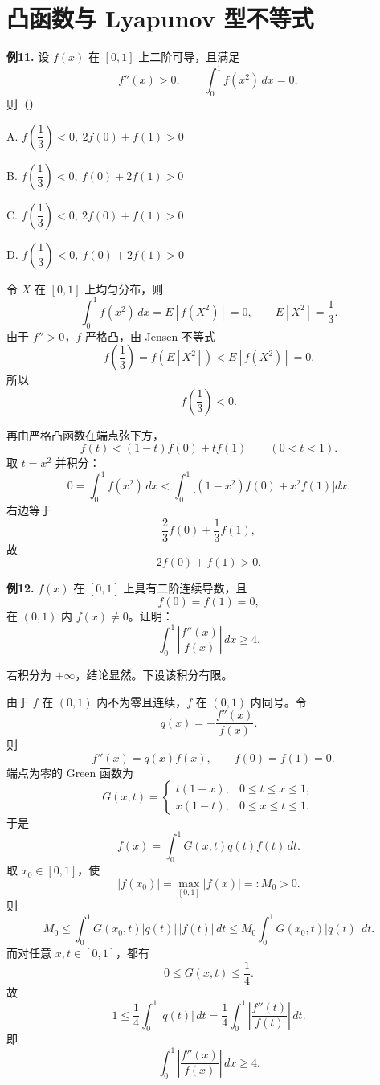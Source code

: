 \section{凸函数与 Lyapunov 型不等式}

\begin{problemblock}
\textbf{例11.} 设 \(f(x)\) 在 \([0,1]\) 上二阶可导，且满足
\[
f''(x)>0,\qquad \int_0^1f(x^2)\,dx=0,
\]
则（\quad）

A. \(f\left(\dfrac13\right)<0,\ 2f(0)+f(1)>0\)

B. \(f\left(\dfrac13\right)<0,\ f(0)+2f(1)>0\)

C. \(f\left(\dfrac13\right)<0,\ 2f(0)+f(1)>0\)

D. \(f\left(\dfrac13\right)<0,\ f(0)+2f(1)>0\)
\end{problemblock}
\begin{solutionblock}
令 \(X\) 在 \([0,1]\) 上均匀分布，则
\[
\int_0^1 f(x^2)\,dx=E[f(X^2)]=0,
\qquad E[X^2]=\frac13.
\]
由于 \(f''>0\)，\(f\) 严格凸，由 Jensen 不等式
\[
f\left(\frac13\right)=f(E[X^2])<E[f(X^2)]=0.
\]
所以
\[
f\left(\frac13\right)<0.
\]

再由严格凸函数在端点弦下方，
\[
f(t)<(1-t)f(0)+tf(1)\qquad(0<t<1).
\]
取 \(t=x^2\) 并积分：
\[
0=\int_0^1f(x^2)\,dx
<
\int_0^1\bigl[(1-x^2)f(0)+x^2f(1)\bigr]dx.
\]
右边等于
\[
\frac23f(0)+\frac13f(1),
\]
故
\[
2f(0)+f(1)>0.
\]
\end{solutionblock}

\begin{problemblock}
\textbf{例12.} \(f(x)\) 在 \([0,1]\) 上具有二阶连续导数，且
\[
f(0)=f(1)=0,
\]
在 \((0,1)\) 内 \(f(x)\ne0\)。证明：
\[
\int_0^1\left|\frac{f''(x)}{f(x)}\right|\,dx\ge4.
\]
\end{problemblock}
\begin{solutionblock}
若积分为 \(+\infty\)，结论显然。下设该积分有限。

由于 \(f\) 在 \((0,1)\) 内不为零且连续，\(f\) 在 \((0,1)\) 内同号。令
\[
q(x)=-\frac{f''(x)}{f(x)}.
\]
则
\[
-f''(x)=q(x)f(x),\qquad f(0)=f(1)=0.
\]
端点为零的 Green 函数为
\[
G(x,t)=
\begin{cases}
t(1-x),&0\le t\le x\le1,\\
x(1-t),&0\le x\le t\le1.
\end{cases}
\]
于是
\[
f(x)=\int_0^1G(x,t)q(t)f(t)\,dt.
\]
取 \(x_0\in[0,1]\)，使
\[
|f(x_0)|=\max_{[0,1]}|f(x)|=:M_0>0.
\]
则
\[
M_0
\le\int_0^1G(x_0,t)|q(t)|\,|f(t)|\,dt
\le M_0\int_0^1G(x_0,t)|q(t)|\,dt.
\]
而对任意 \(x,t\in[0,1]\)，都有
\[
0\le G(x,t)\le\frac14.
\]
故
\[
1\le\frac14\int_0^1|q(t)|\,dt
=\frac14\int_0^1\left|\frac{f''(t)}{f(t)}\right|\,dt.
\]
即
\[
\int_0^1\left|\frac{f''(x)}{f(x)}\right|\,dx\ge4.
\]
\end{solutionblock}

